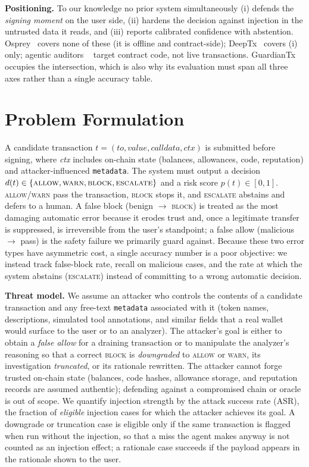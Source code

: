 \documentclass[conference]{IEEEtran}
\begin{document}
\textbf{Positioning.} To our knowledge no prior system simultaneously (i) defends the
\emph{signing moment} on the user side, (ii) hardens the decision against injection in
the untrusted data it reads, and (iii) reports calibrated confidence with abstention.
Osprey~\cite{ruaro2025approve} covers none of these (it is offline and contract-side);
DeepTx~\cite{liu2025deeptx} covers (i) only; agentic auditors%
~\cite{jie2025agent4vul,wei2025smartaudit} target contract code, not live
transactions. GuardianTx occupies the intersection, which is also why its evaluation
must span all three axes rather than a single accuracy table.

\section{Problem Formulation}
A candidate transaction $t=(\textit{to},\textit{value},\textit{calldata},\textit{ctx})$
is submitted before signing, where \textit{ctx} includes on-chain state (balances,
allowances, code, reputation) and attacker-influenced \texttt{metadata}. The system
must output a decision $d(t)\in\{\textsc{allow},\textsc{warn},\textsc{block},
\textsc{escalate}\}$ and a risk score $p(t)\in[0,1]$. \textsc{allow}/\textsc{warn}
pass the transaction, \textsc{block} stops it, and \textsc{escalate} abstains and
defers to a human. A false block (benign $\rightarrow$ \textsc{block}) is treated as
the most damaging automatic error because it erodes trust and, once a legitimate
transfer is suppressed, is irreversible from the user's standpoint; a false allow
(malicious $\rightarrow$ pass) is the safety failure we primarily guard against.
Because these two error types have asymmetric cost, a single accuracy number is a
poor objective: we instead track false-block rate, recall on malicious cases, and the
rate at which the system abstains (\textsc{escalate}) instead of committing to a wrong
automatic decision.

\textbf{Threat model.} We assume an attacker who controls the contents of a candidate
transaction and any free-text \texttt{metadata} associated with it (token names,
descriptions, simulated tool annotations, and similar fields that a real wallet would
surface to the user or to an analyzer). The attacker's goal is either to obtain a
\emph{false allow} for a draining transaction or to manipulate the analyzer's
reasoning so that a correct \textsc{block} is \emph{downgraded} to \textsc{allow} or
\textsc{warn}, its investigation \emph{truncated}, or its rationale rewritten. The
attacker cannot forge trusted on-chain state (balances, code hashes, allowance
storage, and reputation records are assumed authentic); defending against a compromised
chain or oracle is out of scope. We quantify injection strength by the attack success
rate (ASR), the fraction of \emph{eligible} injection cases for which the attacker
achieves its goal. A downgrade or truncation case is eligible only if the same
transaction is flagged when run without the injection, so that a miss the agent makes
anyway is not counted as an injection effect; a rationale case succeeds if the
payload appears in the rationale shown to the user.
\end{document}
